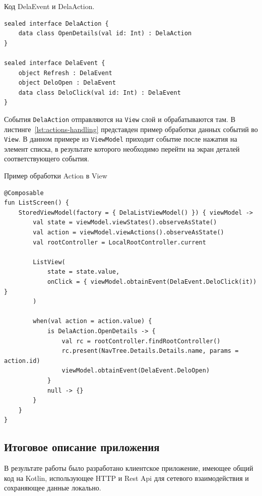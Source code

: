 \documentclass[14pt, russian]{scrartcl}
\begin{document}
\begin{listing}[!htb]
\caption{Код DelaEvent и DelaAction.}
\label{lst:event-action}
\begin{verbatim}
sealed interface DelaAction {
    data class OpenDetails(val id: Int) : DelaAction
}

sealed interface DelaEvent {
    object Refresh : DelaEvent
    object DeloOpen : DelaEvent
    data class DeloClick(val id: Int) : DelaEvent
}
\end{verbatim}
\end{listing}

События \texttt{DelaAction} отправляются на \texttt{View} слой и обрабатываются там. В листинге~\ref{lst:actions-handling} представден пример обработки данных событий во \texttt{View}. В данном примере из \texttt{ViewModel} приходит событие после нажатия на элемент списка, в результате которого необходимо перейти на экран деталей соответствующего события.

\begin{listing}[!htb]
\caption{Пример обработки Action в View}
\label{lst:actions-handling}
\begin{verbatim}
@Composable
fun ListScreen() {
    StoredViewModel(factory = { DelaListViewModel() }) { viewModel ->
        val state = viewModel.viewStates().observeAsState()
        val action = viewModel.viewActions().observeAsState()
        val rootController = LocalRootController.current

        ListView(
            state = state.value,
            onClick = { viewModel.obtainEvent(DelaEvent.DeloClick(it)) }
        )

        when(val action = action.value) {
            is DelaAction.OpenDetails -> {
                val rc = rootController.findRootController()
                rc.present(NavTree.Details.Details.name, params = action.id)
                viewModel.obtainEvent(DelaEvent.DeloOpen)
            }
            null -> {}
        }
    }
}
\end{verbatim}
\end{listing}

\subsection{Итоговое описание приложения}

В результате работы было разработано клиентское приложение, имеющее общий код на Kotlin, использующее HTTP и Rest Api для сетевого взаимодействия и сохраняющее данные локально.
\end{document}
